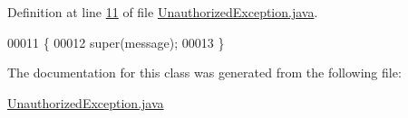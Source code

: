 Definition at line \hyperlink{UnauthorizedException_8java_source_l00011}{11} of file \hyperlink{UnauthorizedException_8java_source}{Unauthorized\-Exception.\-java}.


\begin{DoxyCode}
00011                                                 \{
00012         super(message);
00013     \}
\end{DoxyCode}


The documentation for this class was generated from the following file\-:\begin{DoxyCompactItemize}
\item 
\hyperlink{UnauthorizedException_8java}{Unauthorized\-Exception.\-java}\end{DoxyCompactItemize}
